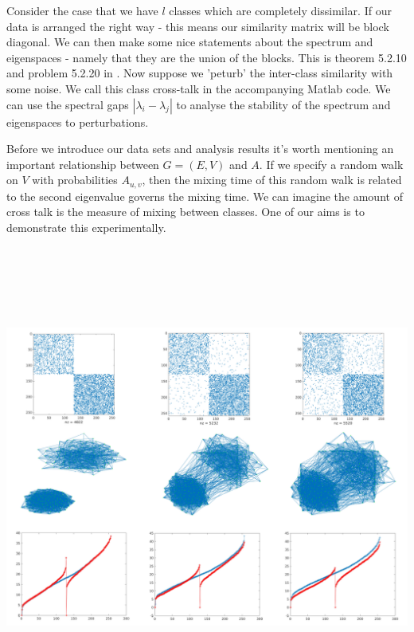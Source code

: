 Consider the case that we have $l$ classes which are completely dissimilar. If our data is arranged the right way - this means our similarity matrix will be block diagonal. We can then make some nice statements about the spectrum and eigenspaces - namely that they are the union of the blocks. This is theorem 5.2.10 and problem 5.2.20 in \cite{watkins2004fundamentals}.  Now suppose we 'peturb' the inter-class similarity with some noise.  We call this class cross-talk in the accompanying Matlab code. We can use the spectral gaps $| \lambda_i - \lambda_j |$ to analyse the stability of the spectrum and eigenspaces to perturbations. 

Before we introduce our data sets and analysis results it's worth mentioning an important relationship between $G=(E,V)$ and $A$.  If we specify a random walk on $V$ with probabilities $A_{u,v}$, then the mixing time of this random walk is related to the second eigenvalue governs the mixing time.  We can imagine the amount of cross talk is the measure of mixing between classes. One of our aims is to demonstrate this experimentally. 

\includegraphics[width=6in,height=6in]{images/2class_gap.png}

